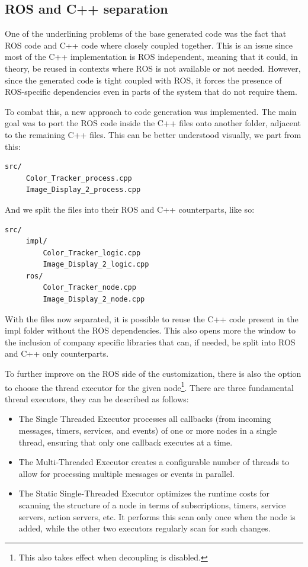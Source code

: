 \subsection{ROS and C++ separation}
\label{sec:impl_ros_separation}

One of the underlining problems of the base generated code was the fact that \gls{ROS} code and C++ code where closely coupled together. This is an issue since most of the C++ implementation is \gls{ROS} independent, meaning that it could, in theory, be reused in contexts where \gls{ROS} is not available or not needed. However, since the generated code is tight coupled with \gls{ROS}, it forces the presence of ROS-specific dependencies even in parts of the system that do not require them. 

To combat this, a new approach to code generation was implemented. The main goal was to port the \gls{ROS} code inside the C++ files onto another folder, adjacent to the remaining C++ files. This can be better understood visually, we part from this:

\begin{verbatim}
src/
	 Color_Tracker_process.cpp
	 Image_Display_2_process.cpp
\end{verbatim}


And we split the files into their \gls{ROS} and C++ counterparts, like so:

\begin{verbatim}
src/
	 impl/
		 Color_Tracker_logic.cpp
		 Image_Display_2_logic.cpp
	 ros/
		 Color_Tracker_node.cpp
		 Image_Display_2_node.cpp
\end{verbatim}

With the files now separated, it is possible to reuse the C++ code present in the impl folder without the \gls{ROS} dependencies. This also opens more the window to the inclusion of company specific libraries that can, if needed, be split into \gls{ROS} and C++ only counterparts.

To further improve on the \gls{ROS} side of the customization, there is also the option to choose the thread executor for the given node\footnote{This also takes effect when decoupling is disabled.}. There are three fundamental thread executors, they can be described as follows:

\begin{itemize} 
	\item The Single Threaded Executor processes all callbacks (from incoming messages, timers, services, and events) of one or more nodes in a single thread, ensuring that only one callback executes at a time.
	\item The Multi-Threaded Executor creates a configurable number of threads to allow for processing multiple messages or events in parallel.
	\item  The Static Single-Threaded Executor optimizes the runtime costs for scanning the structure of a node in terms of subscriptions, timers, service servers, action servers, etc. It performs this scan only once when the node is added, while the other two executors regularly scan for such changes. 
\end{itemize}

